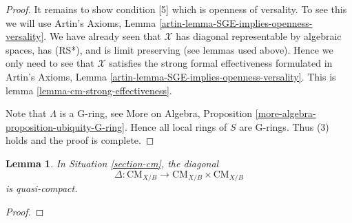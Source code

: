 \documentclass{stacks-project}
\theoremstyle{plain}
\newtheorem{lemma}[subsection]{Lemma}
\theoremstyle{definition}
\theoremstyle{remark}
\numberwithin{equation}{subsection}
\def\CMfunctor{\mathcal{C}\!{\it oh}}
\def\CMfunctor{\text{CM}}
\begin{document}
\begin{proof}
\medskip\noindent
It remains to show condition [5] which is openness of versality.
To see this we will use
Artin's Axioms, Lemma \ref{artin-lemma-SGE-implies-openness-versality}.
We have already seen that $\mathcal{X}$ has diagonal
representable by algebraic spaces, has (RS*), and is limit preserving
(see lemmas used above).
Hence we only need to see that $\mathcal{X}$ satisfies the strong
formal effectiveness formulated in
Artin's Axioms, Lemma \ref{artin-lemma-SGE-implies-openness-versality}.
This is lemma \ref{lemma-cm-strong-effectiveness}.

\medskip\noindent
Note that $\Lambda$ is a G-ring, see
More on Algebra, Proposition \ref{more-algebra-proposition-ubiquity-G-ring}.
Hence all local rings of $S$ are G-rings. Thus (3) holds and the proof is complete.
\end{proof}
\begin{lemma}
	In Situation \ref{section-cm}, the diagonal
	\[\Delta:\CMfunctor_{X/B}\rightarrow\CMfunctor_{X/B}\times\CMfunctor_{X/B}\]
	is quasi-compact.
\end{lemma}
\begin{proof}
	
\end{proof}
\end{document}
